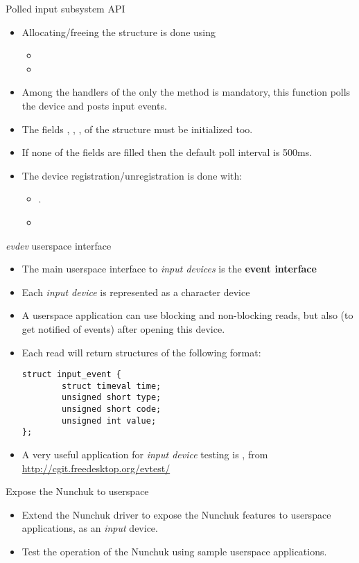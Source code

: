 \begin{frame}[fragile]{Polled input subsystem API}
  \begin{itemize}
  \item Allocating/freeing the  structure is
    done using
    \begin{itemize}
    \item {}
    \item {}
    \end{itemize}
  \item Among the handlers of the  only the
     method is mandatory, this function polls the device
    and posts input events.
  \item The fields , , ,  of
    the  structure must be initialized too.
  \item If none of the  fields are filled then the
    default poll interval is 500ms.
  \item The device registration/unregistration is done with:
    \begin{itemize}
    \item {}.
    \item {}
    \end{itemize}
  \end{itemize}
\end{frame}

\begin{frame}[fragile]{{\em evdev} userspace interface}
  \begin{itemize}
  \item The main userspace interface to {\em input devices} is the
    {\bf event interface}
  \item Each {\em input device} is represented as a
     character device
  \item A userspace application can use blocking and non-blocking
    reads, but also  (to get notified of events) after
    opening this device.
  \item Each read will return  structures of the
    following format:
    \begin{block}{}
    \begin{verbatim}
struct input_event {
        struct timeval time;
        unsigned short type;
        unsigned short code;
        unsigned int value;
};
\end{verbatim}
\end{block}
\item A very useful application for {\em input device} testing is
  , from \url{http://cgit.freedesktop.org/evtest/}
  \end{itemize}
\end{frame}

\setuplabframe
{Expose the Nunchuk to userspace}
{
  \begin{itemize}
  \item Extend the Nunchuk driver to expose the Nunchuk features to
    userspace applications, as an {\em input} device.
  \item Test the operation of the Nunchuk using sample userspace
    applications.
  \end{itemize}
}
